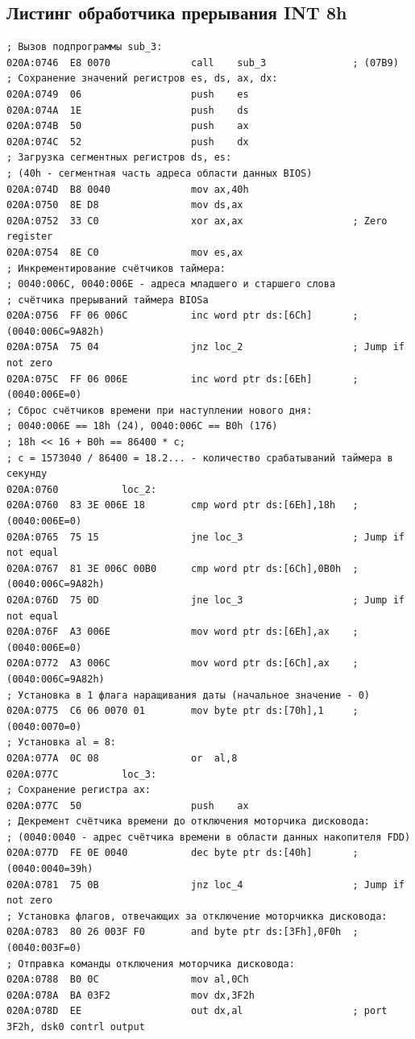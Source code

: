\documentclass[a4paper,12pt]{article}
\begin{document}
\subsection{Листинг обработчика прерывания INT 8h} 
\begin{lstlisting}[style={asm}]
; Вызов подпрограммы sub_3:
020A:0746  E8 0070		  	    call	sub_3			    ; (07B9)
; Сохранение значений регистров es, ds, ax, dx:
020A:0749  06				    push	es
020A:074A  1E				    push	ds
020A:074B  50				    push	ax
020A:074C  52				    push	dx
; Загрузка сегментных регистров ds, es: 
; (40h - сегментная часть адреса области данных BIOS)
020A:074D  B8 0040			    mov	ax,40h
020A:0750  8E D8			    mov	ds,ax
020A:0752  33 C0			    xor	ax,ax			        ; Zero register
020A:0754  8E C0			    mov	es,ax
; Инкрементирование счётчиков таймера:
; 0040:006C, 0040:006E - адреса младшего и старшего слова 
; счётчика прерываний таймера BIOSа
020A:0756  FF 06 006C		    inc	word ptr ds:[6Ch]	    ; (0040:006C=9A82h)
020A:075A  75 04			    jnz	loc_2			        ; Jump if not zero
020A:075C  FF 06 006E		    inc	word ptr ds:[6Eh]	    ; (0040:006E=0)
; Сброс счётчиков времени при наступлении нового дня:
; 0040:006E == 18h (24), 0040:006C == B0h (176)
; 18h << 16 + B0h == 86400 * c; 
; c = 1573040 / 86400 = 18.2... - количество срабатываний таймера в секунду
020A:0760			loc_2:
020A:0760  83 3E 006E 18	    cmp	word ptr ds:[6Eh],18h	; (0040:006E=0)
020A:0765  75 15			    jne	loc_3			        ; Jump if not equal
020A:0767  81 3E 006C 00B0	    cmp	word ptr ds:[6Ch],0B0h	; (0040:006C=9A82h)
020A:076D  75 0D			    jne	loc_3			        ; Jump if not equal
020A:076F  A3 006E			    mov	word ptr ds:[6Eh],ax	; (0040:006E=0)
020A:0772  A3 006C			    mov	word ptr ds:[6Ch],ax	; (0040:006C=9A82h)
; Установка в 1 флага наращивания даты (начальное значение - 0)
020A:0775  C6 06 0070 01	    mov	byte ptr ds:[70h],1	    ; (0040:0070=0)
; Установка al = 8:
020A:077A  0C 08			    or	al,8
020A:077C			loc_3:
; Сохранение регистра ax:
020A:077C  50				    push	ax
; Декремент счётчика времени до отключения моторчика дисковода:
; (0040:0040 - адрес счётчика времени в области данных накопителя FDD)
020A:077D  FE 0E 0040		    dec	byte ptr ds:[40h]	    ; (0040:0040=39h)
020A:0781  75 0B			    jnz	loc_4			        ; Jump if not zero
; Установка флагов, отвечающих за отключение моторчикка дисковода:
020A:0783  80 26 003F F0	    and	byte ptr ds:[3Fh],0F0h	; (0040:003F=0)
; Отправка команды отключения моторчика дисковода:
020A:0788  B0 0C			    mov	al,0Ch
020A:078A  BA 03F2			    mov	dx,3F2h
020A:078D  EE				    out	dx,al			        ; port 3F2h, dsk0 contrl output

\end{lstlisting}
\end{document}
